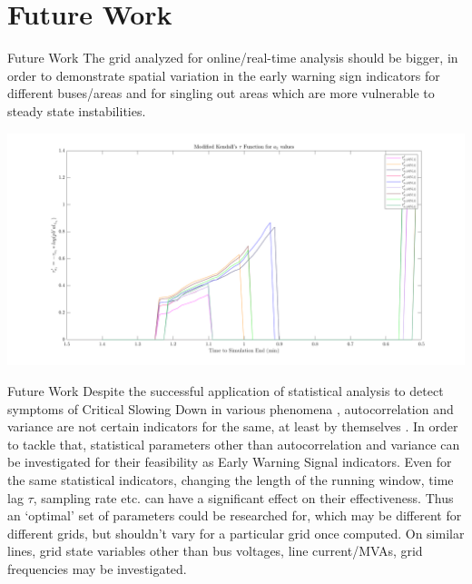 \section[Future Work]{Future Work}
\label{sec:future}

\begin{frame}{Future Work}
The grid analyzed for online/real-time analysis should be bigger, in order to demonstrate spatial variation in the early warning sign indicators for different buses/areas and for singling out areas which are more vulnerable to steady state instabilities.

\includegraphics[scale=0.15]{../figures/im03.png}
\end{frame}

\begin{frame}{Future Work}
Despite the successful application of statistical analysis to detect symptoms of Critical Slowing Down in various phenomena \cite{schefferEarlyWarningSignalsForCriticalTransitions}, autocorrelation and variance are not certain indicators for the same, at least by themselves \cite{csdNotDetectedByAutocorrAndVariance01}.
In order to tackle that, statistical parameters other than autocorrelation and variance can be investigated for their feasibility as Early Warning Signal indicators. Even for the same statistical indicators, changing the length of the running window, time lag $\tau$, sampling rate etc. can have a significant effect on their effectiveness. Thus an `optimal' set of parameters could be researched for, which may be different for different grids, but shouldn't vary for a particular grid once computed.
On similar lines, grid state variables other than bus voltages, line current/MVAs, grid frequencies may be investigated.
\end{frame}
